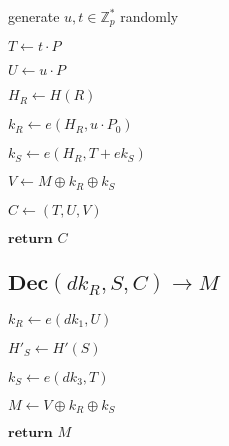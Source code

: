 \documentclass[a4paper]{article}
\begin{document}
generate $u, t \in \mathbb{Z}_p^*$ randomly

$T \gets t \cdot P$

$U \gets u \cdot P$

$H_R \gets H(R)$

$k_R \gets e(H_R, u \cdot P_0)$

$k_S \gets e(H_R, T + \textit{ek}_S)$

$V \gets M \oplus k_R \oplus k_S$

$C \gets (T, U, V)$

$\textbf{return }C$	

\subsection{$\textbf{Dec}(\textit{dk}_R, S, C) \rightarrow M$}

$k_R \gets e(\textit{dk}_1, U)$

$H'_S \gets H'(S)$

$k_S \gets e(\textit{dk}_3, T)$

$M \gets V \oplus k_R \oplus k_S$

$\textbf{return }M$
\end{document}
